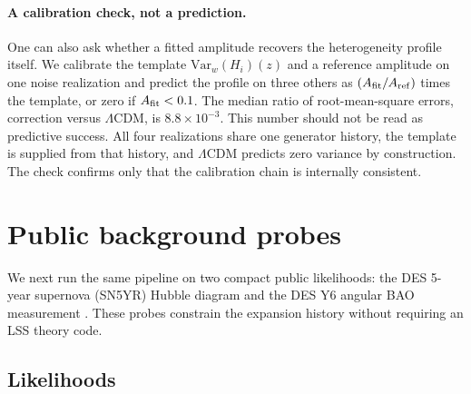 \documentclass[11pt]{article}
\theoremstyle{plain}
\theoremstyle{definition}
\theoremstyle{remark}
\begin{document}
\paragraph{A calibration check, not a prediction.}
One can also ask whether a fitted amplitude recovers the heterogeneity profile itself. We calibrate the template $\mathrm{Var}_w(H_i)(z)$ and a reference amplitude on one noise realization and predict the profile on three others as $(A_{\rm fit}/A_{\rm ref})$ times the template, or zero if $A_{\rm fit}<0.1$. The median ratio of root-mean-square errors, correction versus $\Lambda$CDM, is $8.8\times10^{-3}$. This number should not be read as predictive success. All four realizations share one generator history, the template is supplied from that history, and $\Lambda$CDM predicts zero variance by construction. The check confirms only that the calibration chain is internally consistent.

\section{Public background probes}\label{sec:background}

We next run the same pipeline on two compact public likelihoods: the DES 5-year supernova (SN5YR) Hubble diagram \cite{DES2024SN5YRCosmology,DES2024SN5YRData} and the DES Y6 angular BAO measurement \cite{DES2024Y6BAO}. These probes constrain the expansion history without requiring an LSS theory code.

\subsection{Likelihoods}\label{sec:background:likes}
\end{document}
